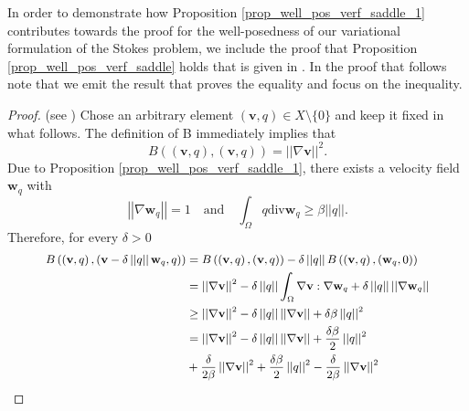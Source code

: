 \documentclass[12pt,a4paper]{article}
\theoremstyle{definition}
\begin{document}
  In order to demonstrate how Proposition \ref{prop_well_pos_verf_saddle_1} contributes towards the proof for the well-posedness of our variational formulation of the Stokes problem, we include the proof that Proposition \ref{prop_well_pos_verf_saddle} holds that is given in \cite[\S4.10.1: Proposition 4.69]{verfurth2013posteriori}.  In the proof that follows note that we emit the result that proves the equality and focus on the inequality.
\begin{proof}(see \cite[\S 4.10: Proposition 4.69]{verfurth2013posteriori})
Chose an arbitrary element $\left(\textbf{v},q\right)\in X\setminus \lbrace 0 \rbrace$ and keep it fixed in what follows.  The definition of B immediately implies that 
\begin{equation}\nonumber
B\left(\left(\textbf{v},q\right),\left(\textbf{v},q\right)\right)= \left|\left|\nabla \textbf{v}\right|\right|^2.
\end{equation}
Due to Proposition \ref{prop_well_pos_verf_saddle_1}, there exists a velocity field $\textbf{w}_q$ with
\begin{equation}\nonumber
\left|\left|\nabla \textbf{w}_q\right|\right|=1 \quad \text{and}\quad \int_{\Omega}q \text{div} \textbf{w}_q \geq \beta \left|\left|q\right|\right|.
\end{equation}
Therefore, for every $\delta > 0$
\begin{equation}\nonumber\small
\begin{aligned}\small
B\left(\left(\textbf{v},q\right),\left(\textbf{v}-\delta\left|\left|q\right|\right|\textbf{w}_q,q\right)\right) &= B\left(\left(\textbf{v},q\right),\left(\textbf{v},q\right)\right)-\delta\left|\left|q\right|\right|B\left(\left(\textbf{v},q\right),\left(\textbf{w}_q,0\right)\right)\\
&=\left|\left|\nabla \textbf{v}\right|\right|^2 -  \delta\left|\left|q\right|\right|\int_{\Omega}\nabla\textbf{v}:\nabla\textbf{w}_q +\delta\left|\left|q\right|\right|\left|\left|\nabla \textbf{w}_q\right|\right|\\
&\geq \left|\left|\nabla \textbf{v}\right|\right|^2 -  \delta\left|\left|q\right|\right|\left|\left|\nabla \textbf{v}\right|\right| +\delta \beta \left|\left|q\right|\right|^2\\
&= \left|\left|\nabla \textbf{v}\right|\right|^2 -  \delta\left|\left|q\right|\right|\left|\left|\nabla \textbf{v}\right|\right| +\frac{\delta \beta }{2}\left|\left|q\right|\right|^2\\& + \frac{\delta}{2\beta}\left|\left|\nabla\textbf{v}\right|\right|^2 +\frac{\delta \beta }{2}\left|\left|q\right|\right|^2 - \frac{\delta}{2\beta}\left|\left|\nabla\textbf{v}\right|\right|^2

\end{aligned}
\end{equation}
\end{proof}
\end{document}
